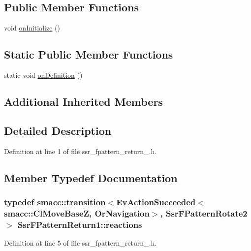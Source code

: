 \subsection*{Public Member Functions}
\begin{DoxyCompactItemize}
\item 
void \hyperlink{structSsrFPatternReturn1_acce01589edd211023478e946a070851a}{on\+Initialize} ()
\end{DoxyCompactItemize}
\subsection*{Static Public Member Functions}
\begin{DoxyCompactItemize}
\item 
static void \hyperlink{structSsrFPatternReturn1_a33764ba1bba88bee311bcb7e62992405}{on\+Definition} ()
\end{DoxyCompactItemize}
\subsection*{Additional Inherited Members}


\subsection{Detailed Description}


Definition at line 1 of file ssr\+\_\+fpattern\+\_\+return\+\_.\+h.



\subsection{Member Typedef Documentation}
\subsubsection[{\texorpdfstring{reactions}{reactions}}]{\setlength{\rightskip}{0pt plus 5cm}typedef {\bf smacc\+::transition}$<$Ev\+Action\+Succeeded$<${\bf smacc\+::\+Cl\+Move\+BaseZ}, {\bf Or\+Navigation}$>$, {\bf Ssr\+F\+Pattern\+Rotate2}$>$ {\bf Ssr\+F\+Pattern\+Return1\+::reactions}}\hypertarget{structSsrFPatternReturn1_a16c93380e7a96658f8164839d90c4215}{}\label{structSsrFPatternReturn1_a16c93380e7a96658f8164839d90c4215}


Definition at line 5 of file ssr\+\_\+fpattern\+\_\+return\+\_.\+h.




